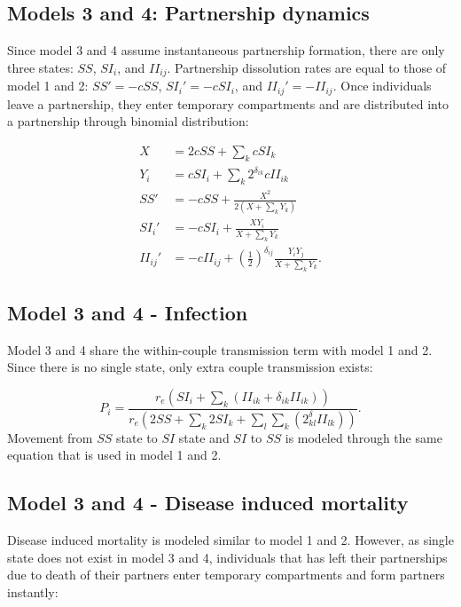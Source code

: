 \documentclass[10pt,letterpaper]{article}
\newcommand{\khalf}{\left(\frac{1}{2}\right)^{\delta_{ij}}}  %
\begin{document}
\subsection*{Models 3 and 4: Partnership dynamics}

Since model 3 and 4 assume instantaneous partnership formation, there are only three states: $SS$, $SI_i$, and $II_{ij}$. Partnership dissolution rates are equal to those of model 1 and 2: $SS' = -cSS$, $SI_i' = - cSI_i$, and $II_{ij}' = - II_{ij}$. Once individuals leave a partnership, they enter temporary compartments and are distributed into a partnership through binomial distribution:

\begin{equation}
\begin{aligned}
X &= 2 c SS + \sum_k c SI_k \\
Y_i &= c SI_i + \sum_k 2^{\delta_{ik}} c II_{ik} \\
SS' &= - c SS + \frac{X^2}{2 (X + \sum_k Y_k)}\\
SI_i' &= - c SI_i + \frac{X Y_i}{X + \sum_k Y_k}\\
II_{ij}' &= - c II_{ij} +\khalf \frac{Y_i Y_j}{X + \sum_k Y_k}.
\end{aligned}
\end{equation}

\subsection*{Model 3 and 4 - Infection}

Model 3 and 4 share the within-couple transmission term with model 1 and 2. Since there is no single state, only extra couple transmission exists:

\begin{equation}
P_i = \frac{r_e (SI_i + \sum_k (II_{ik} + \delta_{ik} II_{ik}))}{r_e(2 SS + \sum_k 2 SI_k + \sum_l \sum_k (2^\delta_{kl} II_{lk}) )}.
\end{equation}
Movement from $SS$ state to $SI$ state and $SI$ to $SS$ is modeled through the same equation that is used in model 1 and 2.

\subsection*{Model 3 and 4 - Disease induced mortality}

Disease induced mortality is modeled similar to model 1 and 2. However, as single state does not exist in model 3 and 4, individuals that has left their partnerships due to death of their partners enter temporary compartments and form partners instantly:
\end{document}
